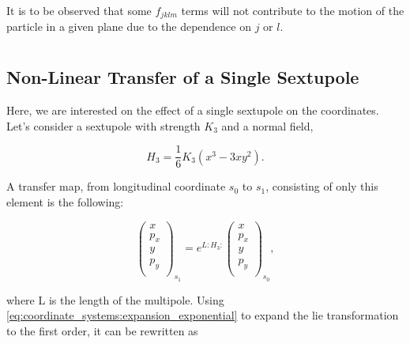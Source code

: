 It is to be observed that some $f_{jklm}$ terms will not contribute to the motion of the particle 
in a given plane due to the dependence on $j$ or $l$.



\section{}


\subsection{Non-Linear Transfer of a Single Sextupole}

Here, we are interested on the effect of a single sextupole on the coordinates.
Let's consider a sextupole with strength $K_3$ and a normal field,

\begin{equation}
    H_3 = \frac{1}{6} K_3 (x^3 - 3xy^2).
\end{equation}

A transfer map, from longitudinal coordinate $s_0$ to $s_1$, consisting of only this element is the
following:

\begin{equation}
    \begin{pmatrix}
        x \\
        p_x \\
        y \\
        p_y \\
    \end{pmatrix}_{s_1}
    =
    e^{L:H_3:}
    \begin{pmatrix}
        x \\
        p_x \\
        y \\
        p_y \\
    \end{pmatrix}_{s_0},
    \label{eq:coordinate_systems:single_sextupole_lie_transfer}
\end{equation}

where L is the length of the multipole. 
Using \cref{eq:coordinate_systems:expansion_exponential} to expand the lie transformation to the
first order, it can be rewritten as

